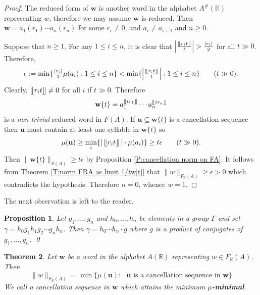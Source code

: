 \documentclass[12pt]{amsart}
\newtheorem{prop}{Proposition}[section]
\newtheorem{theorem}[prop]{Theorem}
\theoremstyle{definition}
\def\RR{\ensuremath{\mathbb{R}}}
\newcommand{\B}[1]{\mathbf{#1}}
\newcommand{\trc}[1]{\{ #1 \}}   %
\def\Free{F}
\newcommand{\myfloor}[1]{\llfloor #1 \rrfloor}
\begin{document}
\begin{proof}
The reduced form of $\B w$ is another word in the alphabet $A^\#(\RR)$ representing $w$, therefore we may assume $\B w$ is reduced.
Then $\B w=a_1(r_1) \cdots a_n(r_n)$ for some $r_i \neq 0$, and $a_i \neq a_{i+1}$ and $n \geq 0$.

Suppose that $n \geq 1$.
For any $1 \leq i \leq n$, it  is clear that $\left| \tfrac{\myfloor{r_it}}{t}\right| > \tfrac{|r_i|}{2}$ for all $t \gg 0$.
Therefore,
\[
\epsilon := \min \{ \tfrac{|r_i|}{2}\mu(a_i) : 1 \leq i \leq n\} < \min \{ \left| \tfrac{\myfloor{r_it}}{t}\right| : 1 \leq i \leq n\} \qquad (t \gg 0).
\]
Clearly, $\myfloor{r_it} \neq 0$ for all $i$ if $t \gg 0$.
Therefore
\[
\B w\trc{t} = a_1^{\myfloor{tr_1}} \cdots a_n^{\myfloor{tr_n}}
\]
is a {\em non trivial} reduced word in $\Free(A)$.
If $\B u \subseteq \B w\trc{t}$ is a cancellation sequence then $\B u$ must contain at least one syllable in $\B w\trc{t}$ so 
\[
\mu(\B u) \geq \min_i \{ |\, \myfloor{r_it}\,| \cdot \mu(a_i)\} \geq t \epsilon \qquad (t \gg 0).
\]
Then $\| \B w\trc{t}\|_{\Free(A)} \geq t\epsilon$ by Proposition \ref{P:cancellation norm on FA}.
It follows from Theorem \ref{T:norm FRA as limit 1/tw[t]}  that $\|w\|_{\Free_\RR(A)} \geq \epsilon>0$ which contradicts the hypothesis.
Therefore $n=0$, whence $w=1$.
\end{proof}


The next observation is left to the reader.


\begin{prop}\label{P:cancellation sequence product conjugates} %
Let $g_1,\dots,g_n$ and $h_0,\dots,h_n$ be elements in a group $\Gamma$ and set $\gamma=h_0 g_1 h_1 g_2 \cdots g_n h_n$.
Then $\gamma=h_0 \cdots h_n \cdot \tilde{g}$ where $\tilde{g}$ is a product of conjugates of $g_1,\dots,g_n$.
\qed
\end{prop}


\begin{theorem}\label{T:norm on FRA as cancellation norm}
Let $\B w$ be a word in the alphabet $A(\RR)$ representing $w \in \Free_\RR(A)$.
Then
\[
\|w\|_{\Free_\RR(A)} = \min \{ \mu(\B u) : \text{ $\B u$ is a cancellation sequence in $\B w$}\}
\]
We call a cancellation sequence in $\B w$ which attains the minimum {\bf $\mu$-minimal}.
\end{theorem}
\end{document}
